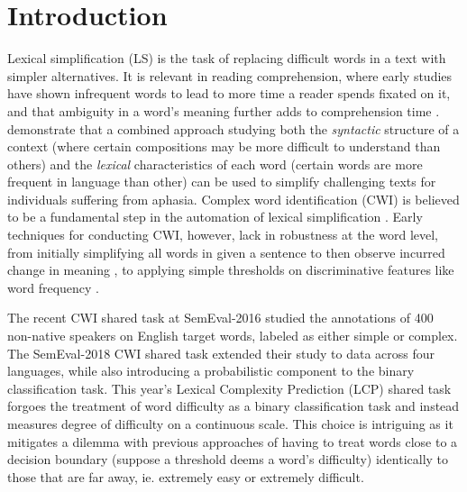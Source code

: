 \documentclass{dcthesis}
\theoremstyle{definition}
\theoremstyle{remark}
\begin{document}


\mainmatter


\chapter{Introduction}

Lexical simplification (LS) is the task of replacing difficult words in a text with simpler alternatives. It is relevant in reading comprehension, where early studies have shown infrequent words to lead to more time a reader spends fixated on it, and that ambiguity in a word's meaning further adds to comprehension time \citep{rayner1986lexical}. \citet{devlin1999simplifying} demonstrate that a combined approach studying both the \textit{syntactic} structure of a context (where certain compositions may be more difficult to understand than others) and the \textit{lexical} characteristics of each word (certain words are more frequent in language than other) can be used to simplify challenging texts for individuals suffering from aphasia. Complex word identification (CWI) is believed to be a fundamental step in the automation of lexical simplification \citep{shardlow2014out}. 
Early techniques for conducting CWI, however, lack in robustness at the word level, from initially simplifying all words in given a sentence to then observe incurred change in meaning \citep{devlin1998use}, to applying simple thresholds on discriminative features like word frequency \citep{zeng2005text}.

The recent CWI shared task at SemEval-2016 \citep{paetzold2016semeval} studied the annotations of 400 non-native speakers on English target words, labeled as either simple or complex. The SemEval-2018 CWI shared task \citep{yimam2018report} extended their study to data across four languages, while also introducing a probabilistic component to the binary classification task. This year's Lexical Complexity Prediction (LCP) shared task \citep{shardlow2021semeval} forgoes the treatment of word difficulty as a binary classification task \citep{paetzold2016semeval, yimam2018report} and instead measures degree of difficulty on a continuous scale. This choice is intriguing as it mitigates a dilemma with previous approaches of having to treat words close to a decision boundary (suppose a threshold deems a word's difficulty) identically to those that are far away, ie. extremely easy or extremely difficult.
\end{document}
